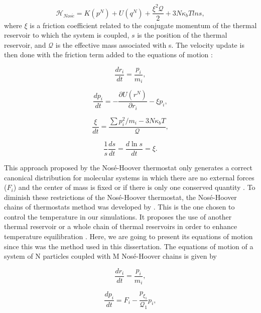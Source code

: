 \begin{equation}
\mathcal{H}_{Nos\acute{e}} =  K(p^{N}) + U(q^{N})  + \frac{\xi ^{2} \mathcal{Q}}{2} + 3N\kappa_{b}T ln s ,
\end{equation}
where $\xi$ is a friction coefficient related to the conjugate momentum of the thermal reservoir to which the system is coupled, $s$ is the position of the thermal reservoir, and $\mathcal{Q}$ is the effective mass associated with s. The velocity update is then done with the friction term added to the equations of motion \cite{shell2015}:

\begin{equation}
\frac{dr_{i}}{dt} = \frac{p_i}{m_i},
\end{equation}

\begin{equation}
\frac{dp_{i}}{dt} = -  \frac{\partial U (r^{N})}{\partial r_{i}} - \xi p_{i},
\end{equation}

\begin{equation}
\frac{\xi}{dt} = \frac{\sum p_{i}^{2}/m_{i} - 3N\kappa_{b}T}{\mathcal{Q}} ,
\end{equation}

\begin{equation}
\frac{1}{s}\frac{ds}{dt} =\frac{d \ln s}{dt} = \xi.
\end{equation}

This approach proposed by the Nos\'{e}-Hoover thermostat only generates a correct canonical distribution for molecular systems in which there are no external forces ($F_{i}$) and the center of mass is fixed or if there is only one conserved quantity \cite{frenkel}. To diminish these restrictions of the Nosé-Hoover thermostat, the Nosé-Hoover chains of thermostats method was developed by . This is the one chosen to control the temperature in our simulations. It proposes the use of another thermal reservoir or a whole chain of thermal reservoirs in order to enhance temperature equilibration \cite{shell2015}. Here, we are going to present its equations of motion since this was the method used in this dissertation. The equations of motion of a system of N particles coupled with M Nos\'{e}-Hoover chains is given by

\begin{equation}
\frac{dr_{i}}{dt} = \frac{p_i}{m_i},
\end{equation}

\begin{equation}
\frac{dp_{i}}{dt} = F_i  - \frac{p_{\xi _{1}}}{\mathcal{Q} _1} p_{i},
\end{equation}

